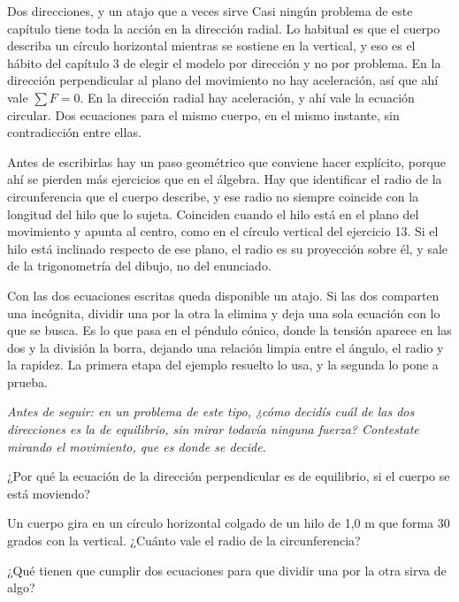 \documentclass[11pt,openany]{book}
\begin{document}
\begin{bloque}{Dos direcciones, y un atajo que a veces sirve}
Casi ningún problema de este capítulo tiene toda la acción en la dirección radial. Lo habitual es que el cuerpo describa un círculo horizontal mientras se sostiene en la vertical, y eso es el hábito del capítulo 3 de elegir el modelo por dirección y no por problema. En la dirección perpendicular al plano del movimiento no hay aceleración, así que ahí vale $\sum F = 0$. En la dirección radial hay aceleración, y ahí vale la ecuación circular. Dos ecuaciones para el mismo cuerpo, en el mismo instante, sin contradicción entre ellas.

Antes de escribirlas hay un paso geométrico que conviene hacer explícito, porque ahí se pierden más ejercicios que en el álgebra. Hay que identificar el radio de la circunferencia que el cuerpo describe, y ese radio no siempre coincide con la longitud del hilo que lo sujeta. Coinciden cuando el hilo está en el plano del movimiento y apunta al centro, como en el círculo vertical del ejercicio 13. Si el hilo está inclinado respecto de ese plano, el radio es su proyección sobre él, y sale de la trigonometría del dibujo, no del enunciado.

Con las dos ecuaciones escritas queda disponible un atajo. Si las dos comparten una incógnita, dividir una por la otra la elimina y deja una sola ecuación con lo que se busca. Es lo que pasa en el péndulo cónico, donde la tensión aparece en las dos y la división la borra, dejando una relación limpia entre el ángulo, el radio y la rapidez. La primera etapa del ejemplo resuelto lo usa, y la segunda lo pone a prueba.

\textit{Antes de seguir: en un problema de este tipo, ¿cómo decidís cuál de las dos direcciones es la de equilibrio, sin mirar todavía ninguna fuerza? Contestate mirando el movimiento, que es donde se decide.}
\end{bloque}

\begin{chequeo}
\item ¿Por qué la ecuación de la dirección perpendicular es de equilibrio, si el cuerpo se está moviendo?
\item Un cuerpo gira en un círculo horizontal colgado de un hilo de 1,0 m que forma 30 grados con la vertical. ¿Cuánto vale el radio de la circunferencia?
\item ¿Qué tienen que cumplir dos ecuaciones para que dividir una por la otra sirva de algo?
\end{chequeo}
\end{document}
